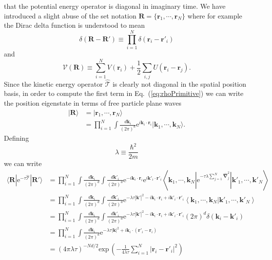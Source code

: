 \documentclass[prb,aps,amssym,nofootinbib,floatfix,notitlepage]{revtex4-1}
\renewcommand{\vec}[1]{\boldsymbol{#1}}
\newcommand{\e}[1]{\mathrm{e}^{#1}}
\renewcommand{\eqref}[1]{Eq.~(\ref{#1})}
\newcommand{\R}{\vec{R}}
\newcommand{\T}{\mathcal{T}}
\begin{document}
that the potential energy operator is diagonal in imaginary time. We have
introduced a slight abuse of the set notation
$\R = \{\vec{r}_1, \cdots, \vec{r}_N \}$ where for example the Dirac delta
function is understood to mean
%
\begin{equation}
    \delta(\R-\R') \equiv \prod_{i=1}^{N}\delta(\vec{r}_i-\vec{r}'_i)
\end{equation}
%
and 
%
\begin{equation}
    \mathcal{V}(\R) \equiv \sum_{i=1}^N V(\vec{r}_i) + \frac{1}{2}\sum_{i,j}
U(\vec{r}_i-\vec{r}_j).
\end{equation}
%
Since the kinetic energy operator $\hat{\T}$ is clearly not diagonal in the
spatial position basis, in order to compute the first term in
\eqref{eq:rhoPrimitive} we can write the position eigenstate in terms of free
particle plane waves
%
\begin{align}
    |\R \rangle &=  | \vec{r}_1, \cdots, \vec{r}_N \rangle \nonumber \\
                &= \prod_{i=1}^N \int \frac{d\vec{k}_i}{(2\pi)^d} 
    \e{i \vec{k}_i \cdot \vec{r}_i} | \vec{k}_1, \cdots, \vec{k}_N\rangle.
\end{align}
%
Defining
%
\begin{equation}
    \lambda \equiv \frac{\hbar^2}{2 m}
\end{equation}
%
we can write
%
\begin{align}
    \langle \R | \e{-\tau\hat{\T}}|\R'\rangle &= \prod_{i=1}^N 
    \int \frac{d\vec{k}_i}{(2\pi)^d} \int \frac{d\vec{k}'_i}{(2\pi)^d} 
    \e{-i \vec{k}_i \cdot \vec{r}_i} \e{i \vec{k}'_i \cdot \vec{r}'_i} 
    \left \langle \vec{k}_1, \cdots, \vec{k}_N \left | \e{-\tau \lambda
\sum_{j=1}^N\hat{\vec{\nabla}}_j^2} \right | \vec{k}'_1, \cdots, \vec{k}'_N
\right \rangle \nonumber \\
&= \prod_{i=1}^N\int \frac{d\vec{k}_i}{(2\pi)^d} \int \frac{d\vec{k}'_i}{(2\pi)^d} 
\e{-\lambda \tau |\vec{k}'|^2 - i \vec{k}_i \cdot \vec{r}_i + i \vec{k}'_i \cdot
\vec{r}'_i} \left \langle \vec{k}_1, \cdots, \vec{k}_N | \vec{k}'_1, \cdots,
\vec{k}'_N \right \rangle \nonumber \\
&= \prod_{i=1}^N\int \frac{d\vec{k}_i}{(2\pi)^d} \int \frac{d\vec{k}'_i}{(2\pi)^d} 
\e{-\lambda \tau |\vec{k}'|^2 - i \vec{k}_i \cdot \vec{r}_i + i \vec{k}'_i \cdot
\vec{r}'_i}  (2\pi)^d \delta(\vec{k}_i-\vec{k}'_i) \nonumber \\
&= \prod_{i=1}^N\int \frac{d\vec{k}_i}{(2\pi)^d} 
\e{-\lambda \tau |\vec{k}|^2 + i \vec{k}_i \cdot (\vec{r}'_i - \vec{r}_i)}  
\nonumber \\
&= (4\pi \lambda \tau)^{-Nd/2} \mathrm{exp}\,\left( -\frac{1}{4\lambda
\tau} \sum_{i=1}^N | \vec{r}_i-\vec{r}'_i|^2 \right) 
\end{align}
\end{document}
